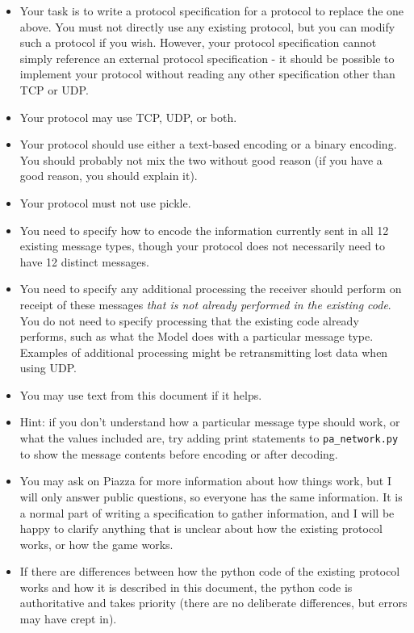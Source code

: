 \documentclass{article}
\begin{document}
\begin{itemize}
\item Your task is to write a protocol specification for a protocol to
replace the one above.  You must not directly use any existing
protocol, but you can modify such a protocol if you wish.  However,
your protocol specification cannot simply reference an external
protocol specification - it should be possible to implement your
protocol without reading any other specification other than TCP or UDP.

\item Your protocol may use TCP, UDP, or both.

\item Your protocol should use either a text-based encoding or a binary
encoding.  You should probably not mix the two without good reason (if you have
a good reason, you should explain it).

\item Your protocol must not use pickle.

\item You need to specify how to encode the information currently sent
 in all 12 existing message types, though your protocol does not
 necessarily need to have 12 distinct messages.

\item You need to specify any additional processing the receiver
 should perform on receipt of these messages {\em that is not already
 performed in the existing code}.  You do not need to specify
 processing that the existing code already performs, such as what the
 Model does with a particular message type.  Examples of additional
 processing might be retransmitting lost data when using UDP.

\item You may use text from this document if it helps.

\item Hint: if you don't understand how a particular message type
  should work, or what the values included are, try adding print
  statements to {\tt pa\_network.py} to show the message contents
  before encoding or after decoding.

\item You may ask on Piazza for more information about how things
  work, but I will only answer public questions, so everyone has the
  same information.  It is a normal part of writing a specification to
  gather information, and I will be happy to clarify anything that is
  unclear about how the existing protocol works, or how the game
  works.

\item If there are differences between how the python code of the
 existing protocol works and how it is described in this document, the
 python code is authoritative and takes priority (there are no
 deliberate differences, but errors may have crept in).
\end{itemize}
\end{document}
